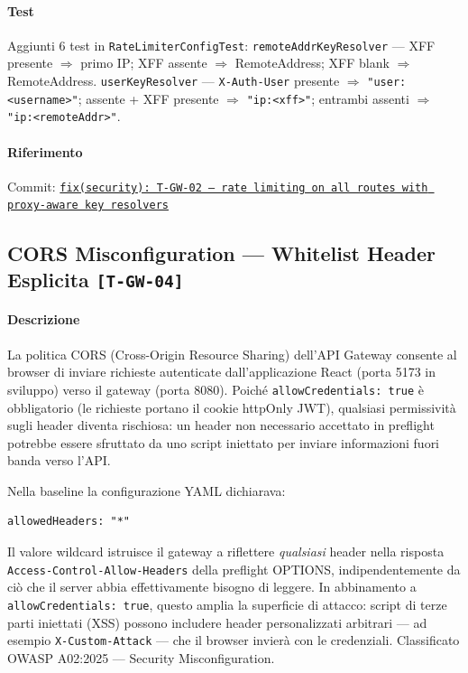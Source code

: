 ﻿\documentclass[a4paper,12pt]{report}
\newcommand{\commitref}[2]{\texttt{\small \href{https://github.com/diegoandruccioli/hotel-pms/commit/#1}{#2}}}
\newcommand{\threat}[1]{\texttt{\small\textcolor{vulnred}{[#1]}}}
\begin{document}
\paragraph{Test} Aggiunti 6 test in \texttt{RateLimiterConfigTest}:
\texttt{remoteAddrKeyResolver} — XFF presente $\Rightarrow$ primo IP; XFF assente $\Rightarrow$ RemoteAddress; XFF blank $\Rightarrow$ RemoteAddress.
\texttt{userKeyResolver} — \texttt{X-Auth-User} presente $\Rightarrow$ \texttt{"user:<username>"}; assente + XFF presente $\Rightarrow$ \texttt{"ip:<xff>"}; entrambi assenti $\Rightarrow$ \texttt{"ip:<remoteAddr>"}.

\paragraph{Riferimento} Commit: \commitref{25c7b57}{fix(security): T-GW-02 --- rate limiting on all routes with proxy-aware key resolvers}

\subsection{CORS Misconfiguration --- Whitelist Header Esplicita \threat{T-GW-04}}

\paragraph{Descrizione}
La politica CORS (Cross-Origin Resource Sharing) dell'API Gateway consente al browser
di inviare richieste autenticate dall'applicazione React (porta 5173 in sviluppo) verso
il gateway (porta 8080).  Poiché \texttt{allowCredentials: true} è obbligatorio (le
richieste portano il cookie httpOnly JWT), qualsiasi permissività sugli header diventa
rischiosa: un header non necessario accettato in preflight potrebbe essere sfruttato
da uno script iniettato per inviare informazioni fuori banda verso l'API.

Nella baseline la configurazione YAML dichiarava:

\begin{lstlisting}[style=yaml]
allowedHeaders: "*"
\end{lstlisting}

Il valore wildcard istruisce il gateway a riflettere \emph{qualsiasi} header nella
risposta \texttt{Access-Control-Allow-Headers} della preflight OPTIONS, indipendentemente
da ciò che il server abbia effettivamente bisogno di leggere.
In abbinamento a \texttt{allowCredentials: true}, questo amplia la superficie di
attacco: script di terze parti iniettati (XSS) possono includere header personalizzati
arbitrari — ad esempio \texttt{X-Custom-Attack} — che il browser invierà con le credenziali.
Classificato OWASP A02:2025 --- Security Misconfiguration.
\end{document}

